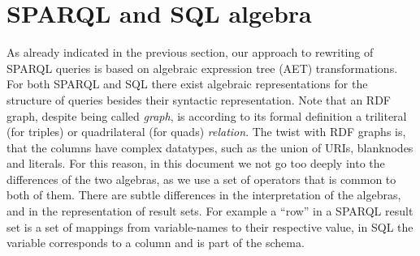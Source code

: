\documentclass[a4paper,twoside,bibtotoc,abstracton,12pt,BCOR=15mm]{scrreprt}
\newcommand{\todo}[1]{\textbf{ToDo: \textit{#1}}}
\begin{document}
\section{SPARQL and SQL algebra}
As already indicated in the previous section, our approach to rewriting of SPARQL queries is based on algebraic expression tree (AET) transformations. 
For both SPARQL and SQL there exist algebraic representations for the structure of queries besides their syntactic representation.
Note that an RDF graph, despite being called \emph{graph}, is according to its formal definition a triliteral (for triples) or quadrilateral (for quads) \emph{relation}.
The twist with RDF graphs is, that the columns have complex datatypes, such as the union of URIs, blanknodes and literals. For this reason, in this document we not
go too deeply into the differences of the two algebras, as we use a set of operators that is common to both of them.
There are subtle differences in the interpretation of the algebras, and in the representation of result sets.
For example a ``row'' in a SPARQL result set is a set of mappings from variable-names to their respective value, in SQL the variable corresponds to a column
and is part of the schema.

\end{document}
